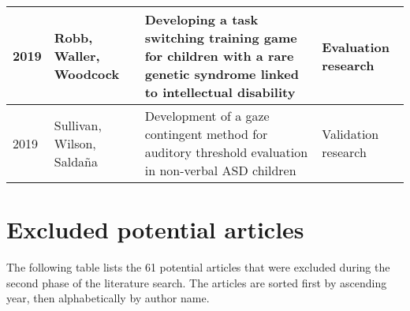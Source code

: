\documentclass[utf8,english]{gradu3}
\begin{document}
\begin{longtable}{|>{\scriptsize}l|>{\scriptsize}p{3cm}|>{\scriptsize}p{8cm}|>{\scriptsize}p{2.4cm}|}
  2019          & Robb, Waller, Woodcock                                               & Developing a task switching training game for children with a rare genetic syndrome linked to intellectual disability                                                                        & Evaluation research        \\ \hline
  2019          & Sullivan, Wilson, Saldaña                                            & Development of a gaze contingent method for auditory threshold evaluation in non-verbal ASD children                                                                                         & Validation research        \\
\end{longtable}


\section{Excluded potential articles} \label{appendixB}

\begin{footnotesize}
  The following table lists the 61 potential articles that were excluded during the second phase of the literature search.
  The articles are sorted first by ascending year, then alphabetically by author name.
\end{footnotesize}
\end{document}
